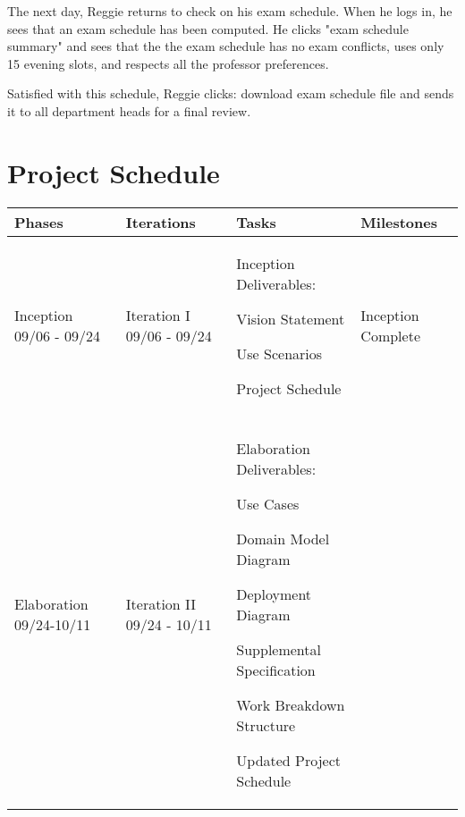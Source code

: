 \documentclass[11pt]{article}
\newenvironment{packed_itemize}{
\begin{itemize}
  \setlength{\itemsep}{1pt}
  \setlength{\parskip}{0pt}
  \setlength{\parsep}{0pt}
}{\end{itemize}}
\begin{document}
\begin{description}
The next day, Reggie returns to check on his exam schedule. When he logs in, he sees
that an exam schedule has been computed. He clicks "exam schedule summary" and sees that
the the exam schedule has no exam conflicts, uses only 15 evening slots, and respects all
the professor preferences. 

Satisfied with this schedule, Reggie clicks: download exam schedule file and sends it to all
department heads for a final review.


\end{description}


\section{Project Schedule} %

\begin{table}
\centering %
\begin{tabular}{|p{0.9in}|p{0.9in}|p{3.2in}|p{.9in}|}
\hline
\textbf{Phases}  & \textbf{Iterations}  & \textbf{Tasks}        & \textbf{Milestones} \\
\hline\hline
 Inception 09/06 - 09/24
   &  Iteration I 09/06 - 09/24  
	& Inception Deliverables:
	 \begin{packed_itemize} 
	\vspace{-0.15in}
		\item Vision Statement
		\item Use Scenarios
		\item Project Schedule
	\end{packed_itemize}
	\vspace{-0.4in}
	& Inception Complete\\
   &        & & \\
\hline
Elaboration 09/24-10/11& 
Iteration II 09/24 - 10/11& 
Elaboration Deliverables: 
	 \begin{packed_itemize} 
	\vspace{-0.15in}
		\item Use Cases
		\item Domain Model Diagram
		\item Deployment Diagram
		\item Supplemental Specification
		\item Work Breakdown Structure
		\item Updated Project Schedule
   \end{packed_itemize}
   \vspace{-0.4in}

\end{tabular}
\end{table}
\end{document}

